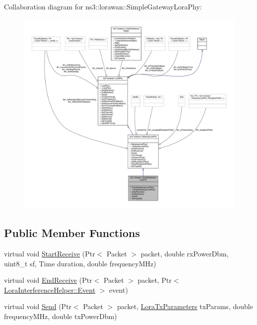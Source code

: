 Collaboration diagram for ns3\+:\+:lorawan\+:\+:Simple\+Gateway\+Lora\+Phy\+:
\nopagebreak
\begin{figure}[H]
\begin{center}
\leavevmode
\includegraphics[width=350pt]{classns3_1_1lorawan_1_1SimpleGatewayLoraPhy__coll__graph}
\end{center}
\end{figure}
\subsection*{Public Member Functions}
\begin{DoxyCompactItemize}
\item 
virtual void \hyperlink{classns3_1_1lorawan_1_1SimpleGatewayLoraPhy_a8ed607e9a11e4c0b759d456a35b68c40}{Start\+Receive} (Ptr$<$ Packet $>$ packet, double rx\+Power\+Dbm, uint8\+\_\+t sf, Time duration, double frequency\+M\+Hz)
\item 
virtual void \hyperlink{classns3_1_1lorawan_1_1SimpleGatewayLoraPhy_aefb2464599926253bfb1003fa14f8fae}{End\+Receive} (Ptr$<$ Packet $>$ packet, Ptr$<$ \hyperlink{classns3_1_1lorawan_1_1LoraInterferenceHelper_1_1Event}{Lora\+Interference\+Helper\+::\+Event} $>$ event)
\item 
virtual void \hyperlink{classns3_1_1lorawan_1_1SimpleGatewayLoraPhy_ab65ad475c7a03520d6e03bdd008b8d93}{Send} (Ptr$<$ Packet $>$ packet, \hyperlink{structns3_1_1lorawan_1_1LoraTxParameters}{Lora\+Tx\+Parameters} tx\+Params, double frequency\+M\+Hz, double tx\+Power\+Dbm)
\end{DoxyCompactItemize}
